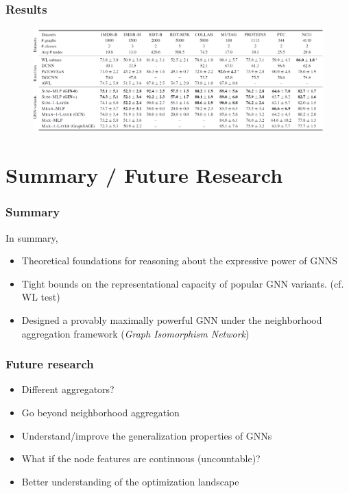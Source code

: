 \documentclass[handout]{beamer}
\begin{document}
\begin{frame}
\frametitle{Results}

\begin{figure}[hbt]
  \includegraphics[height=4cm]{fig6.png}
\end{figure}

\end{frame}


\section{Summary / Future Research}

\begin{frame}
\frametitle{Summary}

In summary, \pause

\begin{itemize}
	\item Theoretical foundations for reasoning about the expressive power of GNNS \pause

	\item Tight bounds on the representational capacity of popular GNN variants. (cf. WL test) \pause

	\item Designed a provably maximally powerful GNN under the neighborhood aggregation framework ({\it Graph Isomorphism Network})
	
\end{itemize}

\end{frame}

\begin{frame}
\frametitle{Future research}

\begin{itemize}
	\item Different aggregators? \pause
	\item Go beyond neighborhood aggregation \pause
	\item Understand/improve the generalization properties of GNNs \pause
	\item What if the node features are continuous (uncountable)? \pause
	\item Better understanding of the optimization landscape
\end{itemize}

\end{frame}
\end{document}
